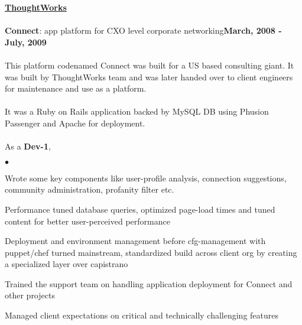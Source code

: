 \documentclass[margin,line]{res}
\newenvironment{list2}{
  \begin{list}{$\bullet$}{%
      \setlength{\itemsep}{0in}
      \setlength{\parsep}{0in} \setlength{\parskip}{0in}
      \setlength{\topsep}{0in} \setlength{\partopsep}{0in} 
      \setlength{\leftmargin}{0.2in}}}{\end{list}}
\begin{document}
\begin{resume}
{\underline {\bf ThoughtWorks}}\\
\\
{\bf Connect}: app platform for CXO level corporate networking\hfill {\bf March, 2008 - July, 2009}\\
\vspace{-.2cm}\\
This platform codenamed Connect was built for a US based consulting giant. It was built by ThoughtWorks team and was later handed over to client engineers for maintenance and use as a platform.\\
\\
It was a Ruby on Rails application backed by MySQL DB using Phusion Passenger and Apache for deployment.\\
\\
As a {\bf Dev-1},
\begin{list2}
\item Wrote some key components like user-profile analysis, connection suggestions, community administration, profanity filter etc.
\item Performance tuned database queries, optimized page-load times and tuned content for better user-perceived performance
\item Deployment and environment management before cfg-management with puppet/chef turned mainstream, standardized build across client org by creating a specialized layer over capistrano
\item Trained the support team on handling application deployment for Connect and other projects
\item Managed client expectations on critical and technically challenging features
\end{list2}


\end{resume}
\end{document}
